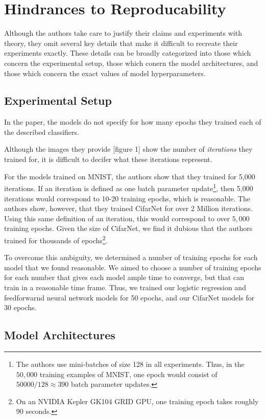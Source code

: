 \documentclass[letterpaper, 10 pt, conference]{ieeeconf}  %
\begin{document}
    
\section{Hindrances to Reproducability}  

Although the authors take care to justify their claims and experiments with theory, they omit several key details that make it difficult to recreate their experiments exactly. These details can be broadly categorized into those which concern the experimental setup, those which conern the model architectures, and those which concern the exact values of model hyperparameters. 

\subsection{Experimental Setup}

In the paper, the models do not specify for how many epochs they trained each of the described classifiers.

Although the images they provide [figure 1] show the number of \emph{iterations} they trained for, it is difficult to decifer what these iterations represent. 

For the models trained on MNIST, the authors show that they trained for 5,000 iterations. If an iteration is defined as one batch parameter update\footnote{The authors use mini-batches of size 128 in all experiments. Thus, in the $50,000$ training examples of MNIST, one epoch would consist of $50000/128 \approx 390$ batch parameter updates.}, then 5,000 iterations would correspond to 10-20 training epochs, which is reasonable. The authors show, however, that they trained CifarNet for over 2 Million iterations. Using this same definition of an iteration, this would correspond to over $5,000$ training epochs. Given the size of CifarNet, we find it dubious that the authors trained for thousands of epochs\footnote{On an NVIDIA Kepler GK104 GRID GPU, one training epoch takes roughly 90 seconds.}.

To overcome this ambiguity, we determined a number of training epochs for each model that we found reasonable. We aimed to choose a number of training epochs for each number that gives each model ample time to converge, but that can train in a reasonable time frame. Thus, we trained our logistic regression and feedforwarnd neural network models for 50 epochs, and our CifarNet models for 30 epochs. 

\subsection{Model Architectures}
\end{document}
